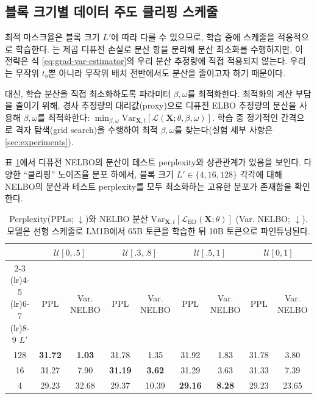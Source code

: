 \documentclass{article} %
\begin{document}
\subsection{블록 크기별 데이터 주도 클리핑 스케줄}\label{sec:data-driven-schedules}
최적 마스크율은 블록 크기 $L'$에 따라 다를 수 있으므로, 학습 중에 스케줄을 적응적으로 학습한다. \cite{kingma2021variational}는 제곱 디퓨전 손실로 분산 항을 분리해 분산 최소화를 수행하지만, 이 전략은 식 \ref{eq:grad-var-estimator}의 우리 분산 추정량에 직접 적용되지 않는다. 우리는 무작위 $t_b$뿐 아니라 무작위 배치 전반에서도 분산을 줄이고자 하기 때문이다.

대신, 학습 분산을 직접 최소화하도록 파라미터 $\beta, \omega$를 최적화한다. 최적화의 계산 부담을 줄이기 위해, 경사 추정량의 대리값(proxy)으로 디퓨전 ELBO 추정량의 분산을 사용해 $\beta, \omega$를 최적화한다: $\min_{\beta, \omega} \text{Var}_{\mathbf{X}, t} \left[ \mathcal{L}(\mathbf{X}; \theta, \beta, \omega) \right]$. 학습 중 정기적인 간격으로 격자 탐색(grid search)을 수행하여 최적 $\beta, \omega$를 찾는다(실험 세부 사항은 \cref{sec:experiments}).

표 \ref{tab:lm1b_vars}에서 디퓨전 NELBO의 분산이 테스트 perplexity와 상관관계가 있음을 보인다. 다양한 ``클리핑'' 노이즈율 분포 하에서, 블록 크기 $L' \in \{4, 16, 128\}$ 각각에 대해 NELBO의 분산과 테스트 perplexity를 모두 최소화하는 고유한 분포가 존재함을 확인한다.



\begin{table}[ht]
    \small
  \caption{Perplexity(PPLs; $\downarrow$)와 NELBO 분산 $\text{Var}_{\mathbf{X}, t}\left[ \mathcal{L}_\text{BD}(\mathbf{X}; \theta)  \right]$ (Var. NELBO; $\downarrow$). 모델은 선형 스케줄로 LM1B에서 65B 토큰을 학습한 뒤 10B 토큰으로 파인튜닝된다.}
  \label{tab:lm1b_vars}
  \centering
  \setlength{\tabcolsep}{6pt} %
  \renewcommand{\arraystretch}{1.1} %
  \begin{tabular}{ccccccccc}
    \toprule
     & \multicolumn{2}{c}{$\mathcal{U}[0, .5]$} & \multicolumn{2}{c}{$\mathcal{U}[.3, .8]$} & \multicolumn{2}{c}{$\mathcal{U}[.5, 1]$} & \multicolumn{2}{c}{$\mathcal{U}[0, 1]$}  \\
    \cmidrule(lr){2-3} \cmidrule(lr){4-5} \cmidrule(lr){6-7} \cmidrule(lr){8-9}
    $L'$     & PPL & Var. NELBO & PPL & Var. NELBO & PPL & Var. NELBO & PPL & Var. NELBO \\
    \midrule
    128  & \textbf{31.72}  & \textbf{1.03} & 31.78   &  1.35  &  31.92 & 1.83 &  31.78 & 3.80  \\
    16 &  31.27 & 7.90 & \textbf{31.19} & \textbf{3.62} &  31.29  & 3.63 &     31.33 & 7.39 \\
    4   &  29.23 & 32.68 & 29.37  & 10.39 & \textbf{29.16}   & \textbf{8.28} & 29.23  &  23.65 \\
    \bottomrule
  \end{tabular}
\end{table}
\end{document}
